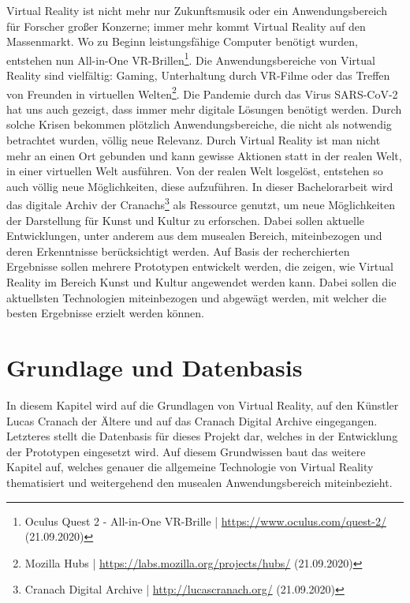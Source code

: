 \documentclass[a4paper,12pt,oneside]{article}
\begin{document}
    Virtual Reality ist nicht mehr nur Zukunftsmusik oder ein Anwendungsbereich für Forscher
    großer Konzerne; immer mehr kommt Virtual Reality auf den Massenmarkt. Wo zu Beginn
    leistungsfähige Computer benötigt wurden, entstehen nun All-in-One VR-Brillen\footnote{Oculus Quest 2 - All-in-One VR-Brille | \url{https://www.oculus.com/quest-2/} (21.09.2020)}.
    Die Anwendungsbereiche von Virtual Reality sind vielfältig: Gaming, Unterhaltung durch VR-Filme oder
    das Treffen von Freunden in virtuellen Welten\footnote{Mozilla Hubs | \url{https://labs.mozilla.org/projects/hubs/} (21.09.2020)}.
    Die Pandemie durch das Virus SARS-CoV-2 hat uns auch gezeigt, dass immer mehr digitale Lösungen
    benötigt werden. Durch solche Krisen bekommen plötzlich Anwendungsbereiche, die nicht als
    notwendig betrachtet wurden, völlig neue Relevanz.
    Durch Virtual Reality ist man nicht mehr an einen Ort gebunden und kann gewisse Aktionen
    statt in der realen Welt, in einer virtuellen Welt ausführen. Von der realen Welt
    losgelöst, entstehen so auch völlig neue Möglichkeiten, diese aufzuführen.
    In dieser Bachelorarbeit wird das digitale Archiv der Cranachs\footnote{Cranach Digital Archive | \url{http://lucascranach.org/} (21.09.2020)}
    als Ressource genutzt, um neue Möglichkeiten der Darstellung für Kunst und Kultur zu erforschen.
    Dabei sollen aktuelle Entwicklungen, unter anderem aus dem musealen Bereich, miteinbezogen 
    und deren Erkenntnisse berücksichtigt werden.
    Auf Basis der recherchierten Ergebnisse sollen mehrere Prototypen entwickelt werden,
    die zeigen, wie Virtual Reality im Bereich Kunst und Kultur angewendet werden kann. 
    Dabei sollen die
    aktuellsten Technologien miteinbezogen und abgewägt werden, mit welcher die
    besten Ergebnisse erzielt werden können.

  \section{Grundlage und Datenbasis}
    In diesem Kapitel wird auf die Grundlagen von Virtual Reality, auf den Künstler Lucas Cranach 
    der Ältere und auf das Cranach Digital Archive eingegangen. Letzteres stellt 
    die Datenbasis für dieses Projekt dar, welches in der Entwicklung der Prototypen 
    eingesetzt wird. 
    Auf diesem Grundwissen baut das weitere Kapitel auf, welches genauer 
    die allgemeine Technologie von Virtual Reality thematisiert und weitergehend
    den musealen Anwendungsbereich miteinbezieht.
\end{document}
